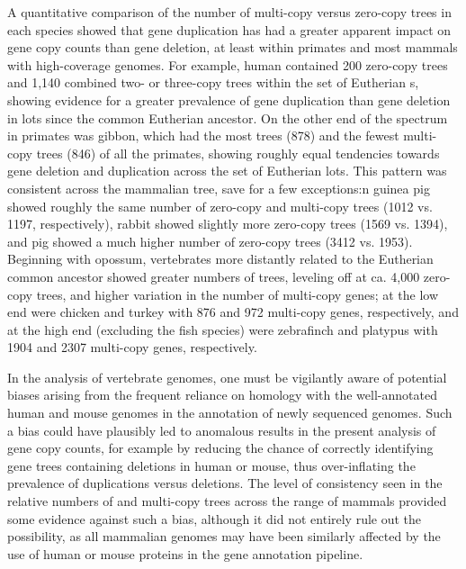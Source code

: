 A quantitative comparison of the number of multi-copy versus zero-copy
trees in each species showed that gene duplication has had a greater
apparent impact on gene copy counts than gene deletion, at least
within primates and most mammals with high-coverage genomes. For
example, human contained 200 zero-copy trees and 1,140 combined two-
or three-copy trees within the set of Eutherian \subtr{}s, showing
evidence for a greater prevalence of gene duplication than gene
deletion in \acp{lot} since the common Eutherian ancestor. On the
other end of the spectrum in primates was gibbon, which had the most
\zcop trees (878) and the fewest multi-copy trees (846) of all the
primates, showing roughly equal tendencies towards gene deletion and
duplication across the set of Eutherian \acp{lot}. This pattern was
consistent across the mammalian tree, save for a few exceptions:n
guinea pig showed roughly the same number of zero-copy and multi-copy
trees (1012 vs. 1197, respectively), rabbit showed slightly more
zero-copy trees (1569 vs. 1394), and pig showed a much higher number
of zero-copy trees (3412 vs. 1953). Beginning with opossum,
vertebrates more distantly related to the Eutherian common ancestor
showed greater numbers of \zcop trees, leveling off at ca. 4,000
zero-copy trees, and higher variation in the number of multi-copy
genes; at the low end were chicken and turkey with 876 and 972
multi-copy genes, respectively, and at the high end (excluding the
fish species) were zebrafinch and platypus with 1904 and 2307
multi-copy genes, respectively.

In the analysis of vertebrate genomes, one must be vigilantly aware of
potential biases arising from the frequent reliance on homology with
the well-annotated human and mouse genomes in the annotation of newly
sequenced genomes. Such a bias could have plausibly led to anomalous
results in the present analysis of gene copy counts, for example by
reducing the chance of correctly identifying gene trees containing
deletions in human or mouse, thus over-inflating the prevalence of
duplications versus deletions. The level of consistency seen in the
relative numbers of \zcop and multi-copy trees across the range of
mammals provided some evidence against such a bias, although it did
not entirely rule out the possibility, as all mammalian genomes may
have been similarly affected by the use of human or mouse proteins in
the \ens gene annotation pipeline.

